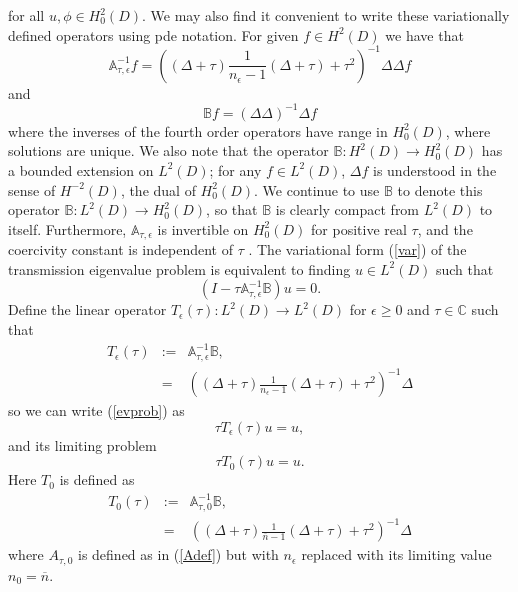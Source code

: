 \documentclass[10pt,a4paper]{amsart}
\begin{document}
for all $u,\phi\in H^2_0(D)$. We may also find it convenient to write these variationally defined operators using pde notation. For given $f\in H^2(D)$ we have that 
$$ \mathbb{A}_{\tau,\epsilon}^{-1} f  = \left( (\Delta +\tau ) \frac{1}{n_\epsilon-1} (\Delta +\tau ) +\tau^2 \right)^{-1}\Delta\Delta f $$
and 
$$ \mathbb{B}f = (\Delta\Delta)^{-1}\Delta f $$
where the inverses of the fourth order operators have range in $H^2_0(D)$, where solutions are unique. We also note that the operator $\mathbb{B}: H^2( D)\rightarrow H^2_0( D)$ has a bounded extension on $L^2( D)$; for any $f\in L^2( D)$, $\Delta f$ is understood in the sense of $H^{-2}(D)$, the dual of $H^2_0(D)$. We continue to use $\mathbb{B}$ to denote this operator $\mathbb{B}:L^2( D)\rightarrow H^2_0( D)$, so that $\mathbb{B}$ is clearly compact from $L^2( D)$ to itself. Furthermore, $\mathbb{A}_{\tau,\epsilon}$ is invertible on $H^2_0(D)$ for positive real $\tau$, and the coercivity constant is independent of $\tau$  \cite{CaHa}. 
The variational form (\ref{var}) of the transmission eigenvalue problem is equivalent to finding $u\in L^2(D)$ such that
\begin{equation}\label{evprob}
(I-\tau \mathbb{A}_{\tau,\epsilon}^{-1}\mathbb{B})u=0.
\end{equation}
Define the linear operator $T_\epsilon(\tau): L^2(D)\to L^2(D)$ for $\epsilon\geq 0$ and $\tau\in \mathbb{C}$ such that
\begin{eqnarray}\label{Te}
 T_\epsilon (\tau) &:= & \mathbb{A}_{\tau,\epsilon}^{-1} \mathbb{B}, \\ 
& = &\left( (\Delta +\tau ) \frac{1}{n_\epsilon-1} (\Delta +\tau ) +\tau^2 \right)^{-1}\Delta  \nonumber
 \end{eqnarray}
so we can write (\ref{evprob}) as
 \begin{equation} \label{TEepsilon}
 \tau T_\epsilon (\tau) u = u,
 \end{equation}
 and its limiting problem
 \begin{equation} \label{TE0}
 \tau T_0 (\tau) u = u.
 \end{equation}
 Here $T_0 $ is defined as 
 \begin{eqnarray}\label{T0}
 T_0 (\tau) &:=&  \mathbb{A}_{\tau,0}^{-1} \mathbb{B}, \\
 & = &\left( (\Delta +\tau ) \frac{1}{\overline{n}-1} (\Delta +\tau ) +\tau^2 \right)^{-1}\Delta  \nonumber
 \end{eqnarray}
 where $A_{\tau,0}$ is defined as in (\ref{Adef}) but with $n_\epsilon$ replaced with its limiting value $n_0=\overline{n}$. 
\end{document}
